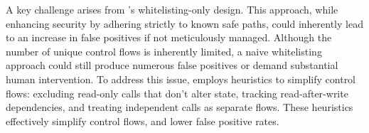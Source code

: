 






A key challenge arises from {\name}'s whitelisting-only design. 
This approach, while enhancing security by adhering
strictly to known safe paths, could inherently lead to an increase in false
positives if not meticulously managed. Although the number of unique control
flows is inherently limited, a naive whitelisting approach could still produce
numerous false positives or demand substantial human intervention. To address
this issue,  {\name} employs heuristics to simplify control flows: 
excluding read-only calls that don't alter state, 
tracking read-after-write dependencies, and treating independent calls as 
separate flows. These heuristics effectively simplify control flows,
and lower false positive rates.

